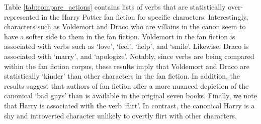 Table \ref{tab:compare_actions} contains lists of verbs that are statistically over-represented in the Harry Potter fan fiction for specific characters. Interestingly, characters such as Voldemort and Draco who are villains in the canon seem to have a softer side to them in the fan fiction. Voldemort in the fan fiction is associated with verbs such as `love', `feel', `help', and `smile'. Likewise, Draco is associated with `marry', and `apologize'. Notably, since verbs are being compared within the fan fiction corpus, these results imply that Voldemort and Draco are statistically `kinder' than other characters in the fan fiction. In addition, the results suggest that authors of fan fiction offer a more nuanced depiction of the canonical `bad guys' than is available in the original seven books. Finally, we note that Harry is associated with the verb `flirt'. In contrast, the canonical Harry is a shy and introverted character unlikely to overtly flirt with other characters. 